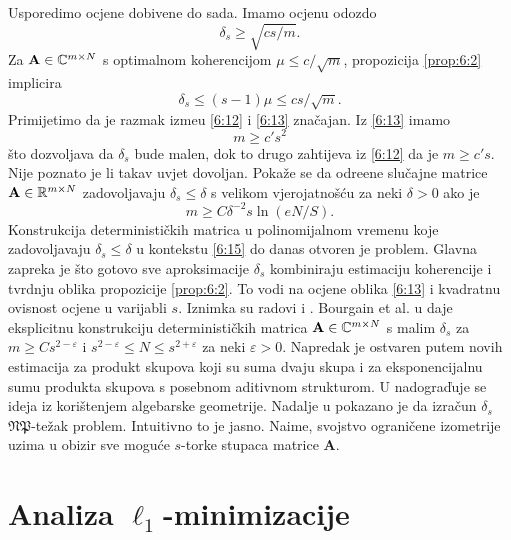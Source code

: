 \documentclass[a4paper,twoside,12pt]{memoir} %
\newcommand{\vect}[1]{\mathbf{#1}}
\renewcommand{\vec}{\vect}
\begin{document}
Usporedimo ocjene dobivene do sada. Imamo ocjenu odozdo
\begin{equation}\label{6:12}
    \delta_s \geq \sqrt{cs/m}. 
\end{equation}
Za $\vec A \in \C^{m \times N}$ s optimalnom koherencijom $\mu \leq c/\sqrt{m}$, propozicija \ref{prop:6:2} implicira
\begin{equation}\label{6:13}
    \delta_s \leq (s-1)\mu \leq cs/\sqrt{m}. 
\end{equation}
Primijetimo da je razmak izme\dj u \eqref{6:12} i \eqref{6:13} zna\v{c}ajan. Iz \eqref{6:13} imamo
\begin{equation}\label{6:14}
    m \geq c' s^2
\end{equation}
\v{s}to dozvoljava da $\delta_s$ bude malen, dok to drugo zahtijeva iz \eqref{6:12} da je $m \geq c's$. Nije poznato je li takav uvjet dovoljan. Poka\v{z}e se da odre\dj ene slu\v{c}ajne matrice $\vec A \in \R^{m \times N}$ zadovoljavaju $\delta_s \leq \delta$ s velikom vjerojatno\v{s}\'cu za neki $\delta > 0$ ako je
\begin{equation}\label{6:15}
    m \geq C \delta^{-2}s \ln(eN/S).
\end{equation}
Konstrukcija deterministi\v{c}kih matrica u polinomijalnom vremenu koje zadovoljavaju $\delta_s \leq \delta$ u kontekstu \eqref{6:15} do danas otvoren je problem. Glavna zapreka je \v{s}to gotovo sve aproksimacije $\delta_s$ kombiniraju estimaciju koherencije i tvrdnju oblika propozicije \ref{prop:6:2}. To vodi na ocjene oblika \eqref{6:13} i kvadratnu ovisnost ocjene u varijabli $s$. Iznimka su radovi \cite{2010arXiv1008.4535B} i \cite{DBLP:journals/corr/Chen15n}. Bourgain et al. u \cite{2010arXiv1008.4535B} daje eksplicitnu konstrukciju deterministi\v{c}kih matrica $\vec A \in \C^{m \times N}$ s malim $\delta_s$ za $m \geq Cs^{2-\varepsilon}$ i $ s^{2-\varepsilon} \leq N \leq s^{2+\varepsilon}$ za neki $\varepsilon > 0$. Napredak je ostvaren putem novih estimacija za produkt skupova koji su suma dvaju skupa i za eksponencijalnu sumu produkta skupova s posebnom aditivnom strukturom. U \cite{DBLP:journals/corr/Chen15n} nadogra\v{d}uje se ideja iz \cite{2010arXiv1008.4535B} kori\v{s}tenjem algebarske geometrije. Nadalje u \cite{2012arXiv1205.2081T} pokazano je da izra\v{c}un $\delta_s$ $\mathfrak{NP}$-te\v{z}ak problem. Intuitivno to je jasno. Naime, svojstvo ograni\v{c}ene izometrije uzima u obizir sve mogu\'ce $s$-torke stupaca matrice $\vec A$.

\newpage
\section[Analiza $\ell_1$-minimizacije][Analiza $\ell_1$-minimizacije]{Analiza $\ell_1$-minimizacije}
\end{document}
